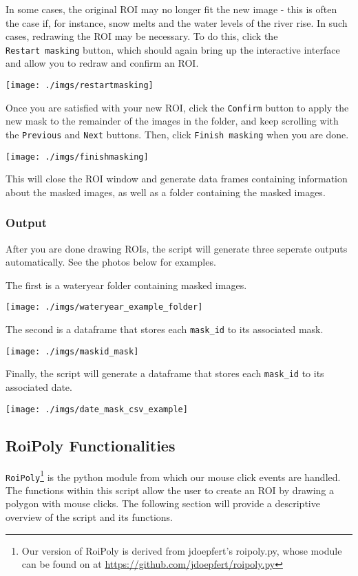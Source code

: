 \documentclass[
]{article}
\begin{document}
In some cases, the original ROI may no longer fit the new image - this is often the case if, for instance, snow melts and the water levels of the river rise. In such cases, redrawing the ROI may be necessary. To do this, click the \texttt{Restart\ masking} button, which should again bring up the interactive interface and allow you to redraw and confirm an ROI.

\texttt{[image: ./imgs/restartmasking]}

Once you are satisfied with your new ROI, click the \texttt{Confirm} button to apply the new mask to the remainder of the images in the folder, and keep scrolling with the \texttt{Previous} and \texttt{Next} buttons. Then, click \texttt{Finish\ masking} when you are done.

\texttt{[image: ./imgs/finishmasking]}

This will close the ROI window and generate data frames containing information about the masked images, as well as a folder containing the masked images.

\hypertarget{output}{%
\subsubsection{Output}\label{output}}

After you are done drawing ROIs, the script will generate three seperate outputs automatically. See the photos below for examples.

The first is a wateryear folder containing masked images.

\texttt{[image: ./imgs/wateryear\_example\_folder]}

The second is a dataframe that stores each \texttt{mask\_id} to its associated mask.

\texttt{[image: ./imgs/maskid\_mask]}

Finally, the script will generate a dataframe that stores each \texttt{mask\_id} to its associated date.

\texttt{[image: ./imgs/date\_mask\_csv\_example]}

\hypertarget{roipoly-functionalities}{%
\subsection{RoiPoly Functionalities}\label{roipoly-functionalities}}

\texttt{RoiPoly}\footnote{Our version of RoiPoly is derived from jdoepfert's roipoly.py, whose module can be found on at \url{https://github.com/jdoepfert/roipoly.py}} is the python module from which our mouse click events are handled. The functions within this script allow the user to create an ROI by drawing a polygon with mouse clicks. The following section will provide a descriptive overview of the script and its functions.
\end{document}
